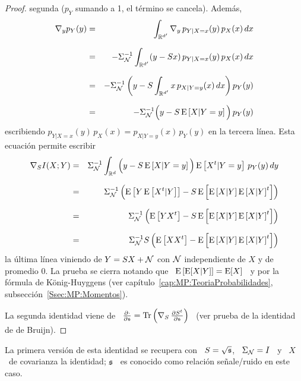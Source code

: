 \begin{proof}
  segunda ($p_Y$ sumando a 1, el t\'ermino se cancela). Adem\'as,
  \begin{eqnarray*}
  \nabla_y p_Y(y) & = & \int_{\mathbb{R}^{d'}} \nabla_y \, p_{Y|X=x}(y) \, p_X(x) \,
  dx\\[2.5mm]
  & = & - \Sigma_{\mathcal{N}}^{-1} \int_{\mathbb{R}^{d'}} (y - S x) \, p_{Y|X=x}(y) \, p_X(x) \,
  dx\\[2.5mm]
  & = & - \Sigma_{\mathcal{N}}^{-1} \left( y - S \int_{\mathbb{R}^{d'}} x \, p_{X|Y=y}(x) \,dx
  \right) p_Y(y)\\[2.5mm]
  & = & - \Sigma_{\mathcal{N}}^{-1} \Big( y - S \operatorname{E}\left[X | Y=y \right] \Big) \, p_Y(y)
  \end{eqnarray*}
  escribiendo $p_{Y|X=x}(y)  \, p_X(x) =  p_{X|Y=y}(x) \, p_Y(y)$ en  la tercera
  l\'inea. Esta ecuaci\'on permite escribir
  \begin{eqnarray*}
  \nabla_S I(X;Y) & = & \Sigma_{\mathcal{N}}^{-1} \int_{\mathbb{R}^d} \Big( y - S \operatorname{E}\left[X |
  Y=y \right] \Big) \operatorname{E}\left[X^t | Y=y \right] \, p_Y(y) \, dy\\[2.5mm]
  & = & \Sigma_{\mathcal{N}}^{-1} \left( \operatorname{E}\left[ Y \operatorname{E}\left[ X^t|Y \right] \right] - S
  \operatorname{E}\left[ \operatorname{E}\left[X | Y \right] \operatorname{E}\left[X | Y \right]^t \right]
  \right)\\[2.5mm]
  & = & \Sigma_{\mathcal{N}}^{-1} \left( \operatorname{E}\left[ Y X^t \right] - S \operatorname{E}\left[
  \operatorname{E}\left[X | Y \right] \operatorname{E}\left[X | Y \right]^t \right] \right)\\[2.5mm]
  & = & \Sigma_{\mathcal{N}}^{-1} S \left( \operatorname{E}\left[ X X^t \right] - \operatorname{E}\left[
  \operatorname{E}\left[X | Y \right] \operatorname{E}\left[X | Y \right]^t \right] \right)
  \end{eqnarray*}
  la \'ultima l\'inea viniendo de $Y  = S X + \mathcal{N}$ con $\mathcal{N}$ independiente
  de  $X$ y  de  promedio 0.   La prueba  se  cierra notando  que \  $\operatorname{E}\left[
    \operatorname{E}[X|Y] \right]  = \operatorname{E}[X]$  \ y por  la f\'ormula de  K\"onig-Huyggens (ver
  cap\'itulo~\ref{cap:MP:TeoriaProbabilidades},
  subsecci\'on~\ref{Ssec:MP:Momentos}).

  La  segunda identidad  viene de  \ $\frac{\partial  \cdot}{\partial  \mathfrak{s}} =
  \operatorname{Tr}\left(  \nabla_S \,  \frac{\partial S^t}{\partial  \mathfrak{s}} \right)$  \ (ver
  prueba de la identidad de de Bruijn).
\end{proof}
%
\noindent  La  primera versi\'on  de  esta  identidad se  recupera  con  \ $S  =
\sqrt{\mathfrak{s}}$, \ $\Sigma_{\mathcal{N}} = I$ \ y \ $X$ \ de covarianza la identidad; $\mathfrak{s}$ \
es conocido como relaci\'on se\~nale/ruido en este caso.

